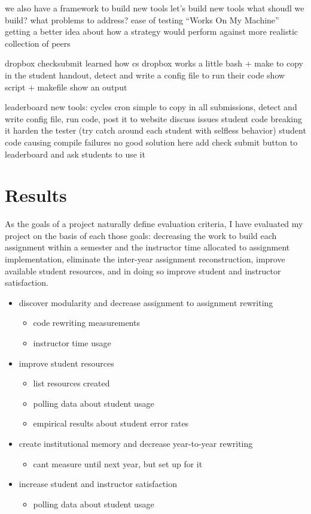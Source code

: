\documentclass[pageno]{jpaper}
\begin{document}
we also have a framework to build new tools
let's build new tools
what shoudl we build?
what problems to address?
ease of testing
``Works On My Machine''
getting a better idea about how a strategy would perform against more realistic collection of peers

dropbox checksubmit
learned how cs dropbox works
a little bash + make to copy in the student handout, detect and write a config file to run their code
show script + makefile
show an output

leaderboard
new tools: cycles cron
simple to copy in all submissions, detect and write config file, run code, post it to website
discuss issues
student code breaking it
harden the tester (try catch around each student with selfless behavior)
student code causing compile failures
no good solution here
add check submit button to leaderboard and ask students to use it

\section*{Results}
As the goals of a project naturally define evaluation criteria, I have evaluated my project on the basis of each those goals: decreasing the work to build each assignment within a semester and the instructor time allocated to assignment implementation, eliminate the inter-year assignment reconstruction, improve available student resources, and in doing so improve student and instructor satisfaction.

\begin{itemize}
\item discover modularity and decrease assignment to assignment rewriting
  \begin{itemize}
  \item code rewriting measurements
  \item instructor time usage
  \end{itemize}
\item improve student resources
  \begin{itemize}
  \item list resources created
  \item polling data about student usage
  \item empirical results about student error rates
  \end{itemize}
\item create institutional memory and decrease year-to-year rewriting
  \begin{itemize}
  \item cant measure until next year, but set up for it
  \end{itemize}
\item increase student and instructor satisfaction
  \begin{itemize}
  \item polling data about student usage
  \end{itemize}
\end{itemize}
\end{document}
